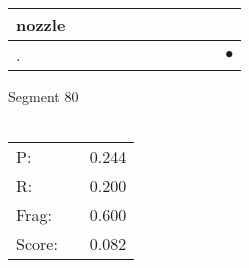 \documentclass[landscape]{article}
\newcommand{\ssp}{\hspace{2pt}}
\newcommand{\mex}{\cellcolor{g}$\bullet$}
\begin{document}
\begin{tabular}{|l|p{10pt}|p{10pt}|p{10pt}|p{10pt}|p{10pt}|p{10pt}|p{10pt}|p{10pt}|p{10pt}|p{10pt}|}
\hline
\ssp nozzle \ssp&\hspace{2pt}&\hspace{2pt}&\hspace{2pt}&\hspace{2pt}&\hspace{2pt}&\hspace{2pt}&\hspace{2pt}&\hspace{2pt}&\hspace{2pt}&\hspace{2pt}\\
\hline
\ssp \cellcolor{ref9}. \ssp&\hspace{2pt}&\hspace{2pt}&\hspace{2pt}&\hspace{2pt}&\hspace{2pt}&\hspace{2pt}&\hspace{2pt}&\hspace{2pt}&\hspace{2pt}&\hspace{2pt}\mex\\
\hline
\end{tabular}

\vspace{6pt}
\noindent Segment 80\\\\
\noindent\begin{tabular}{lm{12pt}r}
\hline
P:&&0.244\\
R:&&0.200\\
Frag:&&0.600\\
Score:&&0.082\\
\end{tabular}

\newpage
\end{document}

